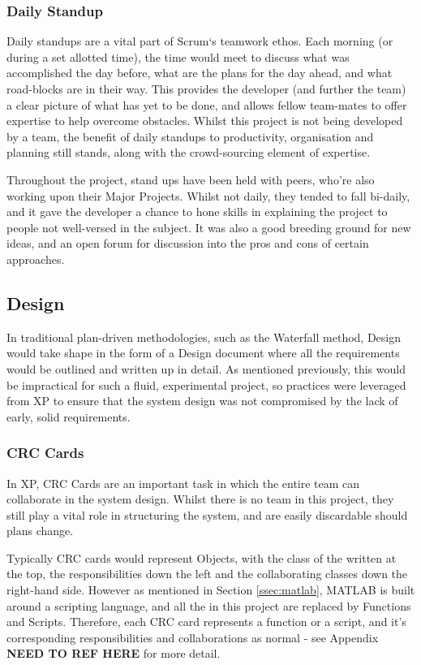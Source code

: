 \subsubsection{Daily Standup}

Daily standups are a vital part of Scrum`s teamwork ethos. Each morning (or during a set allotted time), the time would meet to discuss what was accomplished the day before, what are the plans for the day ahead, and what road-blocks are in their way. This provides the developer (and further the team) a clear picture of what has yet to be done, and allows fellow team-mates to offer expertise to help overcome obstacles. Whilst this project is not being developed by a team, the benefit of daily standups to productivity, organisation and planning still stands, along with the crowd-sourcing element of expertise.

Throughout the project, stand ups have been held with peers, who're also working upon their Major Projects. Whilst not daily, they tended to fall bi-daily, and it gave the developer a chance to hone skills in explaining the project to people not well-versed in the subject. It was also a good breeding ground for new ideas, and an open forum for discussion into the pros and cons of certain approaches.

\subsection{Design}

In traditional plan-driven methodologies, such as the Waterfall method, Design would take shape in the form of a Design document where all the requirements would be outlined and written up in detail. As mentioned previously, this would be impractical for such a fluid, experimental project, so practices were leveraged from \acrfull{XP} to ensure that the system design was not compromised by the lack of early, solid requirements.

\subsubsection{CRC Cards}

In \acrshort{XP}, \acrfull{CRC} Cards are an important task in which the entire team can collaborate in the system design. Whilst there is no team in this project, they still play a vital role in structuring the system, and are easily discardable should plans change.

Typically \acrshort{CRC} cards would represent Objects, with the class of the written at the top, the responsibilities down the left and the collaborating classes down the right-hand side. However as mentioned in Section \ref{ssec:matlab}, MATLAB is built around a scripting language, and all the  in this project are replaced by Functions and Scripts. Therefore, each \acrshort{CRC} card represents a function or a script, and it's corresponding responsibilities and collaborations as normal - see Appendix \textbf{NEED TO REF HERE} for more detail.

